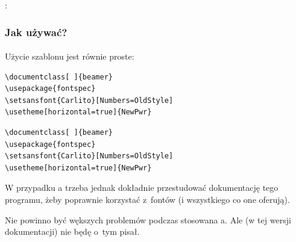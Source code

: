 :

\begin{frame}[fragile]
 \frametitle<presentation>{Jak używać?}
 \framesubtitle{}
 Użycie szablonu jest równie proste:
 \ifpdf
  \begin{lstlisting}  
\documentclass[ ]{beamer}
\usepackage{fontspec}
\setsansfont{Carlito}[Numbers=OldStyle]
\usetheme[horizontal=true]{NewPwr}
\end{lstlisting}
 \else
  \begin{verbatim}  
\documentclass[ ]{beamer}
\usepackage{fontspec}
\setsansfont{Carlito}[Numbers=OldStyle]
\usetheme[horizontal=true]{NewPwr}
\end{verbatim}
 \fi
\end{frame}

W przypadku a trzeba jednak dokładnie przestudować dokumentację tego programu, żeby poprawnie korzystać z~fontów (i wszystkiego co one oferują).

Nie powinno być wększych problemów podczas stosowana a.  Ale (w tej wersji dokumentacji) nie będę o~tym pisał.

%

